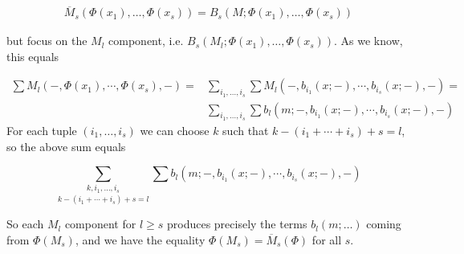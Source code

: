 \documentclass[twoside]{article}
\begin{document}
\begin{align*}
\overline{M}_s(\Phi(x_1),\dots, \Phi(x_s))=B_s(M;\Phi(x_1),\dots, \Phi(x_s))
\end{align*}

but focus on the $M_l$ component, i.e. $B_s(M_l;\Phi(x_1),\dots, \Phi(x_s))$. As we know, this equals

\begin{align*}
\sum M_l(-,\Phi(x_1),\cdots, \Phi(x_s),-)=&\sum_{i_1,\dots, i_s}\sum M_l(-,b_{i_1}(x;-),\cdots,b_{i_s}(x;-),-)=\\
&\sum_{i_1,\dots, i_s}\sum b_l(m;-,b_{i_1}(x;-),\cdots,b_{i_s}(x;-),-)
\end{align*}
For each tuple $(i_1,\dots, i_s)$ we can choose $k$ such that $k-(i_1+\cdots+i_s)+s=l$, so the above sum equals

$$\underset{k-(i_1+\cdots+i_s)+s=l}{\sum_{k,i_1,\dots, i_s}}\sum b_l(m;-,b_{i_1}(x;-),\cdots,b_{i_s}(x;-),-)$$

So each $M_l$ component for $l\geq s$ produces precisely the terms $b_l(m;\dots)$ coming from $\Phi(M_s)$, and we have the equality $\Phi(M_s)=\overline{M}_s(\Phi)$ for all $s$.


\end{document}
